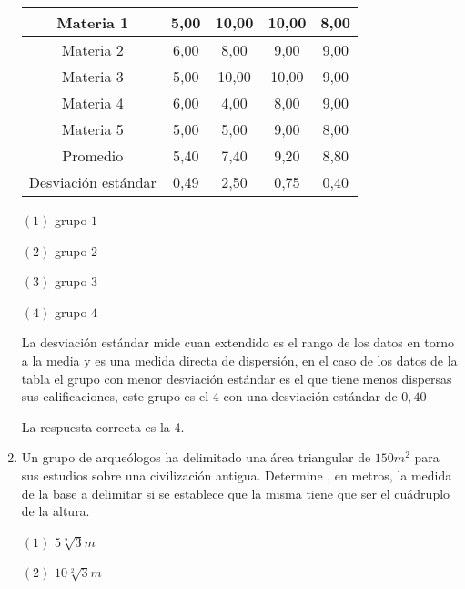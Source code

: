 \documentclass[11pt, a4paper]{article} %
\theoremstyle{dotlessP}
\theoremstyle{dotlessS}
\begin{document}
\begin{enumerate}[label=\color{dg}\theenumi.]
\begin{table}[htbp]
\begin{tabular}{|c|c|c|c|c|}
         \\ \hline
		Materia 1                & 5,00          & 10,00    
        &10,00  &8,00\\ \hline
		Materia 2                 & 6,00           & 8,00 
        &9,00  &9,00  \\ \hline
		Materia 3                 & 5,00       & 10,00    
        &10,00  &9,00\\ 		\hline
		Materia 4                 & 6,00        & 4,00 
        &8,00  &9,00\\ 		\hline
		Materia 5                  & 5,00           & 5,00 
        &9,00  &8,00\\ 		\hline
		 Promedio                 & 5,40        & 7,40    
         &9,20  &8,80 \\ 		\hline
         Desviación estándar      & 0,49         &2,50
         &0,75  &0,40
        
        \\ 		\hline
      
        
        \end{tabular}
	\end{table}
        
         {\color{dh} \((1)\) grupo \(1\)
        
        \((2)\) grupo \(2\) 
        
        \((3)\) grupo \(3\) 
        
        \((4)\) grupo \(4\) }
        
        
         La desviación estándar mide cuan extendido es el rango de los datos en torno a la media y es una medida directa de dispersión, en el caso de los datos de la tabla el grupo con menor desviación estándar es el que tiene menos dispersas sus calificaciones, este grupo es el \(4\) con una desviación estándar de \(0,40\) 
        

		{\color {dh}La respuesta correcta es la 4.}
        
        \item{\color{db}
    Un grupo de arqueólogos ha delimitado una área triangular de \(150m^2\) 
    para sus estudios sobre una civilización antigua. Determine , en metros, la medida de la base a delimitar si se establece que la misma tiene que ser el cuádruplo de la altura.}
    
     {\color{dh} \((1)\) \(5\sqrt[2]{3} m\)
        
        \((2)\) \(10\sqrt[2]{3} m\)
        
}
\end{enumerate}
\end{document}
